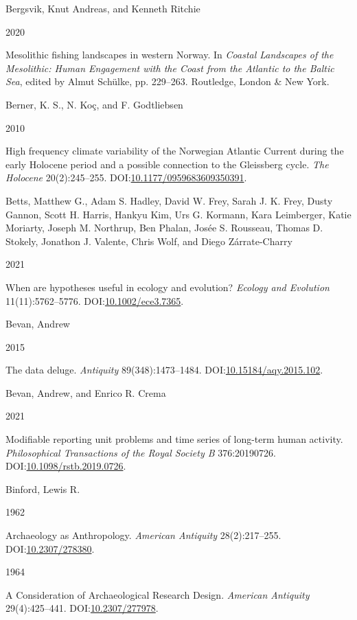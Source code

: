 \documentclass[
  12pt,
  a4paper,
  oneside]{book}
\newlength{\cslhangindent}
\newlength{\csllabelwidth}
\newlength{\cslentryspacingunit} %
\newenvironment{CSLReferences}[2] %
 {%
  \setlength{\parindent}{0pt}
  \ifodd #1
  \let\oldpar\par
  \def\par{\hangindent=\cslhangindent\oldpar}
  \fi
  \setlength{\parskip}{#2\cslentryspacingunit}
 }%
 {}
\newcommand{\CSLBlock}[1]{#1\hfill\break}
\newcommand{\CSLLeftMargin}[1]{\parbox[t]{\csllabelwidth}{#1}}
\newcommand{\CSLRightInline}[1]{\parbox[t]{\linewidth - \csllabelwidth}{#1}\break}
\begin{document}
\begin{CSLReferences}{0}{0}
\leavevmode{}%
\CSLBlock{Bergsvik, Knut Andreas, and Kenneth Ritchie}
\CSLLeftMargin{ 2020}
\CSLRightInline{{Mesolithic fishing landscapes in western Norway}. In \emph{{Coastal Landscapes of the Mesolithic: Human Engagement with the Coast from the Atlantic to the Baltic Sea}}, edited by Almut Schülke, pp. 229--263. Routledge, London \& New York.}

\leavevmode{}%
\CSLBlock{Berner, K. S., N. Koç, and F. Godtliebsen}
\CSLLeftMargin{ 2010}
\CSLRightInline{{High frequency climate variability of the Norwegian Atlantic Current during the early Holocene period and a possible connection to the Gleissberg cycle}. \emph{The Holocene} 20(2):245--255. DOI:\href{https://doi.org/10.1177/0959683609350391}{10.1177/0959683609350391}.}

\leavevmode{}%
\CSLBlock{Betts, Matthew G., Adam S. Hadley, David W. Frey, Sarah J. K. Frey, Dusty Gannon, Scott H. Harris, Hankyu Kim, Urs G. Kormann, Kara Leimberger, Katie Moriarty, Joseph M. Northrup, Ben Phalan, Josée S. Rousseau, Thomas D. Stokely, Jonathon J. Valente, Chris Wolf, and Diego Zárrate-Charry}
\CSLLeftMargin{ 2021}
\CSLRightInline{{When are hypotheses useful in ecology and evolution?} \emph{Ecology and Evolution} 11(11):5762--5776. DOI:\href{https://doi.org/10.1002/ece3.7365}{10.1002/ece3.7365}.}

\leavevmode{}%
\CSLBlock{Bevan, Andrew}
\CSLLeftMargin{ 2015}
\CSLRightInline{The data deluge. \emph{Antiquity} 89(348):1473--1484. DOI:\href{https://doi.org/10.15184/aqy.2015.102}{10.15184/aqy.2015.102}.}

\leavevmode{}%
\CSLBlock{Bevan, Andrew, and Enrico R. Crema}
\CSLLeftMargin{ 2021}
\CSLRightInline{Modifiable reporting unit problems and time series of long-term human activity. \emph{Philosophical Transactions of the Royal Society B} 376:20190726. DOI:\href{https://doi.org/10.1098/rstb.2019.0726}{10.1098/rstb.2019.0726}.}

\leavevmode{}%
\CSLBlock{Binford, Lewis R.}
\CSLLeftMargin{ 1962}
\CSLRightInline{Archaeology as Anthropology. \emph{American Antiquity} 28(2):217--255. DOI:\href{https://doi.org/10.2307/278380}{10.2307/278380}.}

\leavevmode{}%
\CSLLeftMargin{ 1964 }
\CSLRightInline{{A Consideration of Archaeological Research Design}. \emph{American Antiquity} 29(4):425--441. DOI:\href{https://doi.org/10.2307/277978}{10.2307/277978}.}


\end{CSLReferences}
\end{document}
